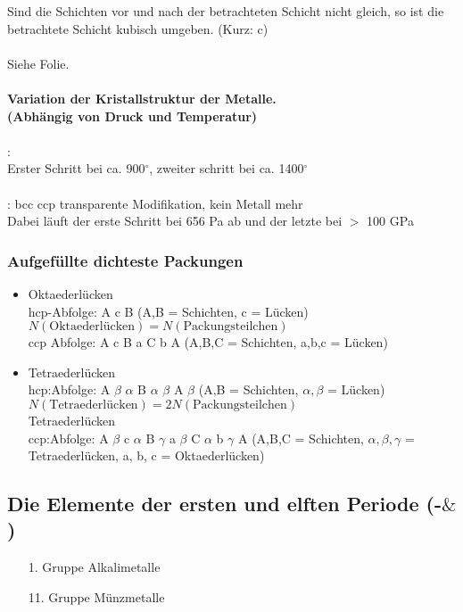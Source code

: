 \documentclass[a4paper, 12pt]{article}
\begin{document}
Sind die Schichten vor und nach der betrachteten Schicht nicht gleich, so ist die betrachtete Schicht kubisch umgeben. (Kurz: c)\\\\
Siehe Folie.\\\\
\textbf{Variation der Kristallstruktur der Metalle.\\(Abhängig von Druck und Temperatur)}\\\\
: \\
Erster Schritt bei ca. 900$^\circ$, zweiter schritt bei ca. 1400$^\circ$\\\\
: bcc \ce{->} ccp \ce{-> -> ->} transparente Modifikation, kein Metall mehr\\
Dabei läuft der erste Schritt bei 656 Pa ab und der letzte bei $>$ 100 GPa
\subsubsection{Aufgefüllte dichteste Packungen}
\begin{itemize}
    \item Oktaederlücken\\hcp-Abfolge: A c B (A,B = Schichten, c = Lücken)\\$N(\mathrm{Oktaederl\text{ü}cken})=N(\mathrm{Packungsteilchen})$\\
            ccp Abfolge: A c B a C b A (A,B,C = Schichten, a,b,c = Lücken)
    \item Tetraederlücken\\hcp:Abfolge: A $\beta$ $\alpha$ B $\alpha$ $\beta$ A $\beta$ (A,B = Schichten, $\alpha, \beta$ = Lücken)\\$N(\mathrm{Tetraederl\text{ü}cken})=2N(\mathrm{Packungsteilchen})$\\Tetraederlücken\\
            ccp:Abfolge: A $\beta$ c $\alpha$ B $\gamma$ a $\beta$ C $\alpha$ b $\gamma$ A (A,B,C = Schichten, $\alpha, \beta, \gamma$ = Tetraederlücken, a, b, c = Oktaederlücken)
\end{itemize}

\subsection{Die Elemente der ersten und elften Periode (-$\&$)}
\begin{itemize}
    \item[1. Gruppe] Alkalimetalle
    \item[11. Gruppe] Münzmetalle 
\end{itemize}
\end{document}
